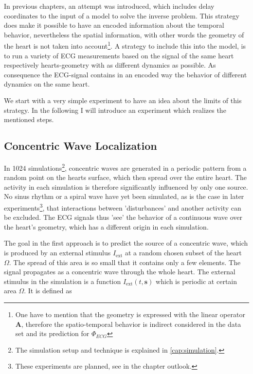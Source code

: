In previous chapters, an attempt was introduced, which includes delay coordinates to the input of a model to solve the inverse problem. This strategy does make it possible to have an encoded information about the temporal behavior, nevertheless the spatial information, with other words the geometry of the heart is not taken into account\footnote{One have to mention that the geometry is expressed with the linear operator $\textbf{A}$, therefore the spatio-temporal behavior is indirect considered in the data set and its prediction for $\varPhi_{ECG}$}. A strategy to include this into the model, is to run a variety of ECG measurements based on the signal of the same heart respectively hearts-geometry with as different dynamics as possible. As consequence the ECG-signal contains in an encoded way the behavior of different dynamics on the same heart. 

We start with a very simple experiment to have an idea about the limits of this strategy. In the following I will introduce an experiment which realizes the mentioned steps.

\subsection{Concentric Wave Localization}\label{cap:concentricwave}
In 1024 simulations\footnote{The simulation setup and technique is explained in \ref{cap:simulation}.}, concentric waves are generated in a periodic pattern from a random point on the hearts surface, which then spread over the entire heart. The activity in each simulation is therefore significantly influenced by only one source. No sinus rhythm or a spiral wave have yet been simulated, as is the case in later experiments\footnote{These experiments are planned, see in the chapter outlook.}, that interactions between 'disturbances' and another activity can be excluded. The ECG signals thus 'see' the behavior of a continuous wave over the heart's geometry, which has a different origin in each simulation.

The goal in the first approach is to predict the source of a concentric wave, which is produced by an external stimulus $I_{\text{ext}}$ at a random chosen subset of the heart $\Omega$. The spread of this area is so small that it contains only a few elements. The signal propagates as a concentric wave through the whole heart. The external stimulus in the simulation is a function $I_{\text{ext}}(t, \textbf{s})$ which is periodic at certain area $\Omega$. It is defined as 

